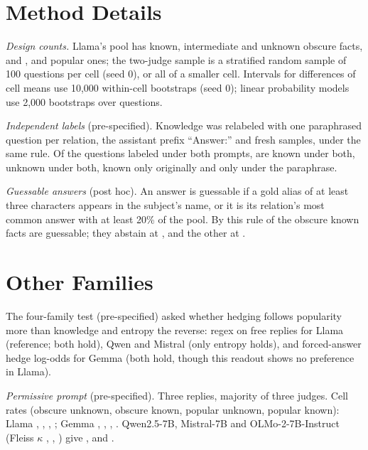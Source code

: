 \documentclass[manuscript,screen,review,anonymous,nonacm]{acmart}
\begin{document}
\appendix

\section{Method Details}
\label{app:robust}

\emph{Design counts.} Llama's pool has \lkObsPoolKnown{} known, \lkObsPoolMaybe{} intermediate and \lkObsPoolUnk{} unknown obscure facts, and \lkPopPoolKnown{}, \lkPopPoolMaybe{} and \lkPopPoolUnk{} popular ones; the two-judge sample is a stratified random sample of 100 questions per cell (seed 0), or all of a smaller cell. Intervals for differences of cell means use 10,000 within-cell bootstraps (seed 0); linear probability models use 2,000 bootstraps over questions.

\emph{Independent labels} (pre-specified). Knowledge was relabeled with one paraphrased question per relation, the assistant prefix ``Answer:'' and fresh samples, under the same rule. Of the \lcBothN{} questions labeled under both prompts, \lcKK{} are known under both, \lcUU{} unknown under both, \lcKU{} known only originally and \lcUK{} only under the paraphrase.

\emph{Guessable answers} (post hoc). An answer is guessable if a gold alias of at least three characters appears in the subject's name, or it is its relation's most common answer with at least 20\% of the pool. By this rule \rcGuessN{} of the \gsObsKnownTotal{} obscure known facts are guessable; they abstain at \rcGuessAbs, and the other \rcNonGuessN{} at \rcNonGuessAbs.

\section{Other Families}
\label{app:families}

The four-family test (pre-specified) asked whether hedging follows popularity more than knowledge and entropy the reverse: regex on free replies for Llama (reference; both hold), Qwen and Mistral (only entropy holds), and forced-answer hedge log-odds for Gemma (both hold, though this readout shows no preference in Llama).

\emph{Permissive prompt} (pre-specified). Three replies, majority of three judges. Cell rates (obscure unknown, obscure known, popular unknown, popular known): Llama \pmLlamaObsUnk, \pmLlamaObsKnown, \pmLlamaPopUnk, \pmLlamaPopKnown; Gemma \pmGemmaObsUnk, \pmGemmaObsKnown, \pmGemmaPopUnk, \pmGemmaPopKnown. Qwen2.5-7B, Mistral-7B and OLMo-2-7B-Instruct (Fleiss $\kappa$ \pmQwenKappa, \pmMistralKappa, \pmOlmoKappa) give \pmQwenDiff{} \pmQwenDiffCI, \pmMistralDiff{} \pmMistralDiffCI{} and \pmOlmoDiff{} \pmOlmoDiffCI.
\end{document}
